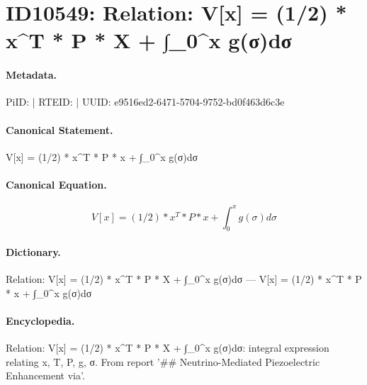 \section*{ID10549: Relation: V[x] = (1/2) * x\textasciicircum{}T * P * X + ∫\_0\textasciicircum{}x g(σ)dσ}
\paragraph{Metadata.}
PiID:  | RTEID:  | UUID: e9516ed2-6471-5704-9752-bd0f463d6c3e

\paragraph{Canonical Statement.}
V[x] = (1/2) * x\textasciicircum{}T * P * x + ∫\_0\textasciicircum{}x g(σ)dσ

\paragraph{Canonical Equation.}
\[
V[x] = (1/2) * x^T * P * x + ∫_0^x g(σ)dσ
\]

\paragraph{Dictionary.}
Relation: V[x] = (1/2) * x\textasciicircum{}T * P * X + ∫\_0\textasciicircum{}x g(σ)dσ — V[x] = (1/2) * x\textasciicircum{}T * P * x + ∫\_0\textasciicircum{}x g(σ)dσ

\paragraph{Encyclopedia.}
Relation: V[x] = (1/2) * x\textasciicircum{}T * P * X + ∫\_0\textasciicircum{}x g(σ)dσ: integral expression relating x, T, P, g, σ. From report '\#\# Neutrino-Mediated Piezoelectric Enhancement via'.
